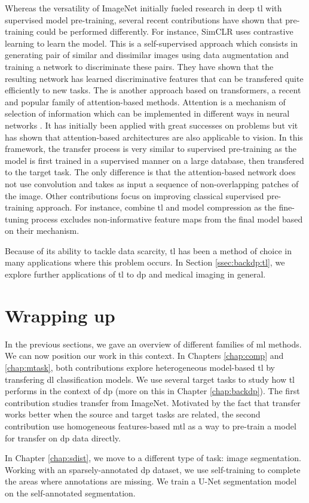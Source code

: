 Whereas the versatility of ImageNet initially fueled research in deep \acrlong{tl}
with supervised model pre-training, several recent contributions have shown that
pre-training could be performed differently. For instance, SimCLR \parencite{chen2020simple}
uses contrastive learning to learn the model. This is a self-supervised approach
which consists in generating pair of similar and dissimilar images using data
augmentation and training a network to discriminate these pairs. They have shown
that the resulting network has learned discriminative features that can be transfered
quite efficiently to new tasks. The  \parencite{dosovitskiy2020image}
is another approach based on transformers, a recent and popular family of
attention-based methods. Attention is a mechanism of selection of information
which can be implemented in different ways in neural networks \parencite{niu2021review}.
It has initially been applied with great successes on  problems
but \acrshort{vit} has shown that attention-based architectures are also applicable
to vision. In this framework, the transfer process is very similar to supervised
pre-training as the model is first trained in a supervised manner on a large
database, then transfered to the target task. The only difference is that the
attention-based network does not use convolution and takes as input a sequence of
non-overlapping patches of the image. Other contributions focus on improving
classical supervised pre-training approach. For instance, \parencite{wang2019pay}
combine \acrlong{tl} and model compression as the fine-tuning process
excludes non-informative feature maps from the final model based on their
 mechanism.

Because of its ability to tackle data scarcity, \acrlong{tl} has been a method of
choice in many applications where this problem occurs. In Section \ref{ssec:backdp:tl},
we explore further applications of \acrlong{tl} to \acrlong{dp} and medical imaging
in general.

\section{Wrapping up}

In the previous sections, we gave an overview of different families of \acrlong{ml}
methods. We can now position our work in this context. In Chapters \ref{chap:comp}
and \ref{chap:mtask}, both contributions explore heterogeneous model-based
\acrlong{tl} by transfering \acrlong{dl} classification models. We use several
target tasks to study how \acrlong{tl} performs in the context of \acrlong{dp}
(more on this in Chapter \ref{chap:backdp}). The first contribution studies transfer
from ImageNet. Motivated by the fact that transfer works better when the source
and target tasks are related, the second contribution use homogeneous features-based
\acrlong{mtl} as a way to pre-train a model for transfer on \acrlong{dp} data
directly.

In Chapter \ref{chap:sdist}, we move to a different type of task: image segmentation.
Working with an sparsely-annotated \acrlong{dp} dataset, we use self-training to
complete the areas where annotations are missing. We train a U-Net segmentation
model on the self-annotated segmentation.
